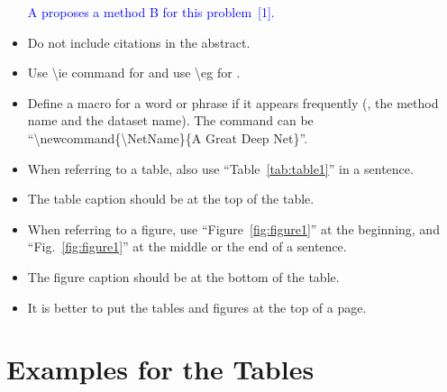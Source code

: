 \documentclass[10pt,twocolumn,letterpaper]{article}
\newcommand{\correct}[1]{\textcolor{blue}{#1 \checkmark}}
\begin{document}
\begin{itemize}
        \correct{A proposes a method B for this problem~[1].}
    \item Do not include citations in the abstract.
    \item Use \textbackslash ie command for \ie and use \textbackslash eg for \eg.
    \item Define a macro for a word or phrase if it appears frequently (\eg, the method name and the dataset name). The command can be\\``\textbackslash newcommand\{\textbackslash NetName\}\{A Great Deep Net\}''.
    \item When referring to a table, also use ``Table~\ref{tab:table1}'' in a sentence.
    \item The table caption should be at the top of the table.
    \item When referring to a figure, use ``Figure~\ref{fig:figure1}'' at the beginning, and ``Fig.~\ref{fig:figure1}'' at the middle or the end of a sentence.
    \item The figure caption should be at the bottom of the table.
    \item It is better to put the tables and figures at the top of a page.
\end{itemize}


\clearpage
\section{Examples for the Tables}

\newpage



\clearpage

\end{document}
